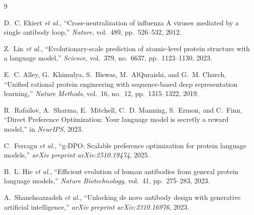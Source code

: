 \documentclass[11pt, a4paper]{article}
\begin{document}
\begin{thebibliography}{9}
\small
 
D.~C. Ekiert \emph{et al.},
``Cross-neutralization of influenza A viruses mediated by a single antibody loop,''
\emph{Nature}, vol.~489, pp.~526--532, 2012.
 
Z.~Lin \emph{et al.},
``Evolutionary-scale prediction of atomic-level protein structure with a language model,''
\emph{Science}, vol.~379, no.~6637, pp.~1123--1130, 2023.
 
E.~C. Alley, G.~Khimulya, S.~Biswas, M.~AlQuraishi, and G.~M. Church,
``Unified rational protein engineering with sequence-based deep representation learning,''
\emph{Nature Methods}, vol.~16, no.~12, pp.~1315--1322, 2019.
 
R.~Rafailov, A.~Sharma, E.~Mitchell, C.~D. Manning, S.~Ermon, and C.~Finn,
``Direct Preference Optimization: Your language model is secretly a reward model,''
in \emph{NeurIPS}, 2023.
 
C.~Ferragu \emph{et al.},
``g-DPO: Scalable preference optimization for protein language models,''
\emph{arXiv preprint arXiv:2510.19474}, 2025.
 
B.~L. Hie \emph{et al.},
``Efficient evolution of human antibodies from general protein language models,''
\emph{Nature Biotechnology}, vol.~41, pp.~275--283, 2023.
 
A.~Shanehsazzadeh \emph{et al.},
``Unlocking de novo antibody design with generative artificial intelligence,''
\emph{arXiv preprint arXiv:2310.16976}, 2023.
 
\end{thebibliography}
 
\end{document}
